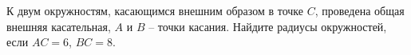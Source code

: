 \begin{ex}
	\begin{condition}
		К двум окружностям, касающимся внешним образом в точке \( C \), проведена общая внешняя касательная, \( A  \) и \( B \) – точки касания. Найдите радиусы окружностей, если \( AC = 6 \), \( BC = 8 \).
	\end{condition}
\end{ex}